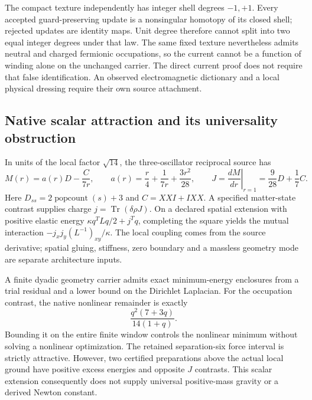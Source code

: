 The compact texture independently has integer shell degrees $-1,+1$. Every accepted guard-preserving update is a nonsingular homotopy of its closed shell; rejected updates are identity maps. Unit degree therefore cannot split into two equal integer degrees under that law. The same fixed texture nevertheless admits neutral and charged fermionic occupations, so the current cannot be a function of winding alone on the unchanged carrier. The direct current proof does not require that false identification. An observed electromagnetic dictionary and a local physical dressing require their own source attachment.

\subsection{Native scalar attraction and its universality obstruction}

In units of the local factor $\sqrt{14}$, the three-oscillator reciprocal source has
\[
 M(r)=a(r)D-\frac{C}{7r},\qquad
 a(r)=\frac r4+\frac{1}{7r}+\frac{3r^2}{28},\qquad
 J=\left.\frac{dM}{dr}\right|_{r=1}=\frac9{28}D+\frac17 C.
\]
Here $D_{ss}=2\operatorname{popcount}(s)+3$ and $C=XXI+IXX$. A specified matter-state contrast supplies charge $j=\operatorname{Tr}(\delta\rho J)$. On a declared spatial extension with positive elastic energy $\kappa q^TLq/2+j^Tq$, completing the square yields the mutual interaction $-j_xj_y(L^{-1})_{xy}/\kappa$. The local coupling comes from the source derivative; spatial gluing, stiffness, zero boundary and a massless geometry mode are separate architecture inputs.

A finite dyadic geometry carrier admits exact minimum-energy enclosures from a trial residual and a lower bound on the Dirichlet Laplacian. For the occupation contrast, the native nonlinear remainder is exactly
\[
 \frac{q^2(7+3q)}{14(1+q)}.
\]
Bounding it on the entire finite window controls the nonlinear minimum without solving a nonlinear optimization. The retained separation-six force interval is strictly attractive. However, two certified preparations above the actual local ground have positive excess energies and opposite $J$ contrasts. This scalar extension consequently does not supply universal positive-mass gravity or a derived Newton constant.
